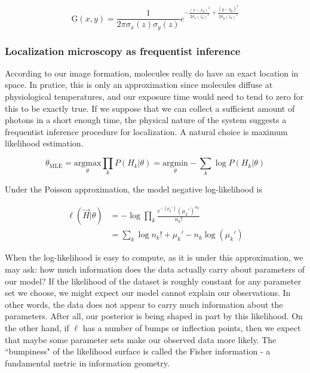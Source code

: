 \documentclass{ucetd}
\begin{document}
\begin{equation}
\mathrm{G}(x,y) = \frac{1}{2\pi\sigma_{x}(z)\sigma_{y}(z)}e^{-\frac{(x-x_{0})^{2}}{2\sigma_{x}(z_{0})^{2}}+\frac{(y-y_{0})^{2}}{2\sigma_{y}(z_{0})^{2}}}
\end{equation}


\subsubsection{Localization microscopy as frequentist inference}

According to our image formation, molecules really do have an exact location in space. In pratice, this is only an approximation since molecules diffuse at physiological temperatures, and our exposure time would need to tend to zero for this to be exactly true. If we suppose that we can collect a sufficient amount of photons in a short enough time, the physical nature of the system suggests a frequentist inference procedure for localization. A natural choice is maximum likelihood estimation. 

\begin{equation*}
\theta_{\mathrm{MLE}} = \underset{\theta}{\mathrm{argmax}}\prod_{k}P(H_{k}|\theta)= \underset{\theta}{\mathrm{argmin}}-\sum_{k}\log P(H_{k}|\theta)
\end{equation*}

Under the Poisson approximation, the model negative log-likelihood is

\begin{align}
\ell(\vec{H}|\theta) &= -\log \prod_{k} \frac{e^{-\left(\mu_{k}'\right)}\left(\mu_{k}'\right)^{n_{k}}}{n_{k}!}\\
&= \sum_{k}  \log n_{k}! + \mu_{k}' - n_{k}\log\left(\mu_{k}'\right)
\end{align}

When the log-likelihood is easy to compute, as it is under this approximation, we may ask: how much information does the data actually carry about parameters of our model? If the likelihood of the dataset is roughly constant for any parameter set we choose, we might expect our model cannot explain our observations. In other words, the data does not appear to carry much information about the parameters. After all, our posterior is being shaped in part by this likelihood. On the other hand, if $\ell$ has a number of bumps or inflection points, then we expect that maybe some parameter sets make our observed data more likely. The ``bumpiness" of the likelihood surface is called the Fisher information - a fundamental metric in information geometry. 
\end{document}
